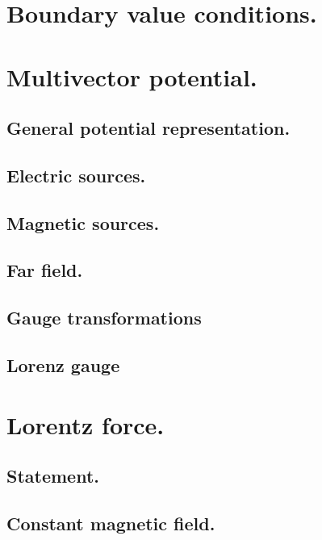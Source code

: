       \section{Boundary value conditions.}
         
      \section{Multivector potential.}
         \subsection{General potential representation.}
            
         \subsection{Electric sources.}
            
         \subsection{Magnetic sources.}
            
         \subsection{Far field.}
            
         \subsection{Gauge transformations}
            
         \subsection{Lorenz gauge}
            
      \section{Lorentz force.}
         \subsection{Statement.}
            
         \subsection{Constant magnetic field.}
            
